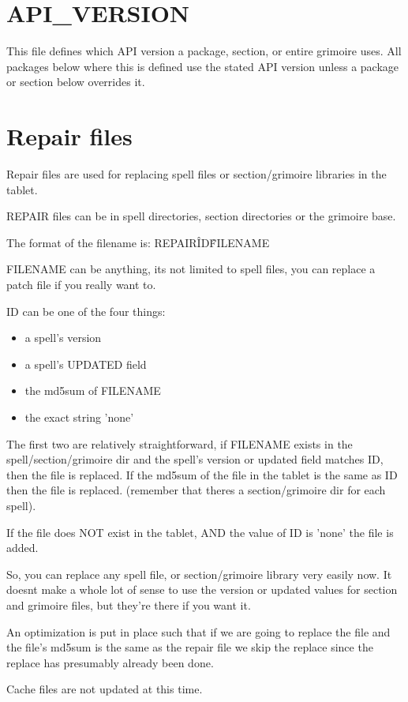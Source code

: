 \documentclass[a4paper,10pt]{book}
\begin{document}
\section{API\_VERSION}
This file defines which API version a package, section, or entire grimoire
uses. All packages below where this is defined use the stated API version
unless a package or section below overrides it.

\section{Repair files}
Repair files are used for replacing spell files or section/grimoire libraries
in the tablet.

REPAIR files can be in spell directories, section directories or the grimoire
base.

The format of the filename is: REPAIR\^ID\^FILENAME

FILENAME can be anything, its not limited to spell files, you can replace a
patch file if you really want to.

ID can be one of the four things:
\begin{itemize}
\item a spell's version
\item a spell's UPDATED field
\item the md5sum of FILENAME
\item the exact string 'none'
\end{itemize}

The first two are relatively straightforward, if FILENAME exists in the
spell/section/grimoire dir and the spell's version or updated field matches ID,
then the file is replaced. If the md5sum of the file in the tablet is the same
as ID then the file is replaced. (remember that theres a section/grimoire dir
for each spell).

If the file does NOT exist in the tablet, AND the value of ID is 'none' the
file is added.

So, you can replace any spell file, or section/grimoire library very easily
now. It doesnt make a whole lot of sense to use the version or updated values
for section and grimoire files, but they're there if you want it.

An optimization is put in place such that if we are going to replace the file
and the file's md5sum is the same as the repair file we skip the replace since
the replace has presumably already been done.

Cache files are not updated at this time.
\end{document}
